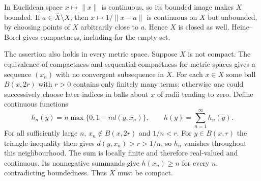 In Euclidean space $x\mapsto\|x\|$ is continuous, so its bounded image makes $X$ bounded. If $a\in\overline X\setminus X$, then $x\mapsto1/\|x-a\|$ is continuous on $X$ but unbounded, by choosing points of $X$ arbitrarily close to $a$. Hence $X$ is closed as well. Heine--Borel gives compactness, including for the empty set.

The assertion also holds in every metric space. Suppose $X$ is not compact. The equivalence of compactness and sequential compactness for metric spaces gives a sequence $(x_n)$ with no convergent subsequence in $X$. For each $x\in X$ some ball $B(x,2r)$ with $r>0$ contains only finitely many terms: otherwise one could successively choose later indices in balls about $x$ of radii tending to zero. Define continuous functions
\[
 h_n(y)=n\max\{0,1-n d(y,x_n)\},\qquad h(y)=\sum_{n=1}^\infty h_n(y).
\]
For all sufficiently large $n$, $x_n\notin B(x,2r)$ and $1/n<r$. For $y\in B(x,r)$ the triangle inequality then gives $d(y,x_n)>r>1/n$, so $h_n$ vanishes throughout this neighbourhood. The sum is locally finite and therefore real-valued and continuous. Its nonnegative summands give $h(x_n)\ge n$ for every $n$, contradicting boundedness. Thus $X$ must be compact.
